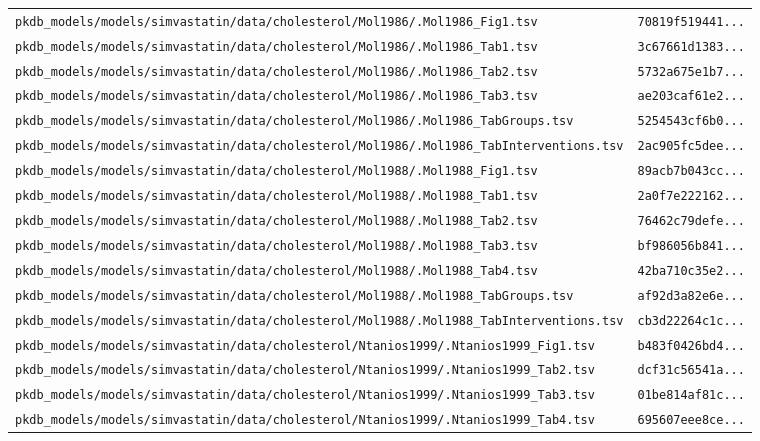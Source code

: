 \documentclass{article}
\begin{document}
\begin{longtable}{ll}
\texttt{pkdb\_models/models/simvastatin/data/cholesterol/Mol1986/.Mol1986\_Fig1.tsv} & \texttt{70819f519441...} \\
\texttt{pkdb\_models/models/simvastatin/data/cholesterol/Mol1986/.Mol1986\_Tab1.tsv} & \texttt{3c67661d1383...} \\
\texttt{pkdb\_models/models/simvastatin/data/cholesterol/Mol1986/.Mol1986\_Tab2.tsv} & \texttt{5732a675e1b7...} \\
\texttt{pkdb\_models/models/simvastatin/data/cholesterol/Mol1986/.Mol1986\_Tab3.tsv} & \texttt{ae203caf61e2...} \\
\texttt{pkdb\_models/models/simvastatin/data/cholesterol/Mol1986/.Mol1986\_TabGroups.tsv} & \texttt{5254543cf6b0...} \\
\texttt{pkdb\_models/models/simvastatin/data/cholesterol/Mol1986/.Mol1986\_TabInterventions.tsv} & \texttt{2ac905fc5dee...} \\
\texttt{pkdb\_models/models/simvastatin/data/cholesterol/Mol1988/.Mol1988\_Fig1.tsv} & \texttt{89acb7b043cc...} \\
\texttt{pkdb\_models/models/simvastatin/data/cholesterol/Mol1988/.Mol1988\_Tab1.tsv} & \texttt{2a0f7e222162...} \\
\texttt{pkdb\_models/models/simvastatin/data/cholesterol/Mol1988/.Mol1988\_Tab2.tsv} & \texttt{76462c79defe...} \\
\texttt{pkdb\_models/models/simvastatin/data/cholesterol/Mol1988/.Mol1988\_Tab3.tsv} & \texttt{bf986056b841...} \\
\texttt{pkdb\_models/models/simvastatin/data/cholesterol/Mol1988/.Mol1988\_Tab4.tsv} & \texttt{42ba710c35e2...} \\
\texttt{pkdb\_models/models/simvastatin/data/cholesterol/Mol1988/.Mol1988\_TabGroups.tsv} & \texttt{af92d3a82e6e...} \\
\texttt{pkdb\_models/models/simvastatin/data/cholesterol/Mol1988/.Mol1988\_TabInterventions.tsv} & \texttt{cb3d22264c1c...} \\
\texttt{pkdb\_models/models/simvastatin/data/cholesterol/Ntanios1999/.Ntanios1999\_Fig1.tsv} & \texttt{b483f0426bd4...} \\
\texttt{pkdb\_models/models/simvastatin/data/cholesterol/Ntanios1999/.Ntanios1999\_Tab2.tsv} & \texttt{dcf31c56541a...} \\
\texttt{pkdb\_models/models/simvastatin/data/cholesterol/Ntanios1999/.Ntanios1999\_Tab3.tsv} & \texttt{01be814af81c...} \\
\texttt{pkdb\_models/models/simvastatin/data/cholesterol/Ntanios1999/.Ntanios1999\_Tab4.tsv} & \texttt{695607eee8ce...} \\

\end{longtable}
\end{document}
